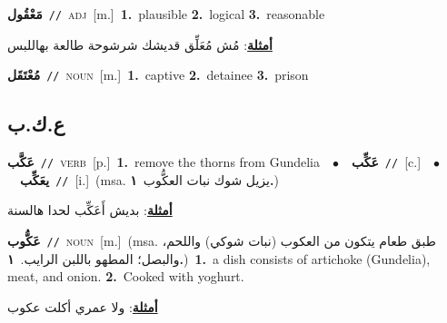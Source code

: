 \documentclass[10pt,a4paper,twoside]{article} %
\begin{document}
\begin{multicols}{2}
{\setlength\topsep{0pt}\textbf{\foreignlanguage{arabic}{مَعْقُول}}\ {\color{gray}\texttt{//}\color{black}}\ \textsc{adj}\ [m.]\ \textbf{1.}~plausible  \textbf{2.}~logical  \textbf{3.}~reasonable\  \begin{flushright}\color{gray}\foreignlanguage{arabic}{\textbf{\underline{\foreignlanguage{arabic}{أمثلة}}}: مُش مُعَلِّق قديشك شرشوحة طالعة بهاللبس}\end{flushright}\color{black}} \vspace{2mm}

{\setlength\topsep{0pt}\textbf{\foreignlanguage{arabic}{مُعْتَقَل}}\ {\color{gray}\texttt{//}\color{black}}\ \textsc{noun}\ [m.]\ \textbf{1.}~captive  \textbf{2.}~detainee  \textbf{3.}~prison\ } \vspace{2mm}

\vspace{-3mm}
\subsection*{\color{blue}\foreignlanguage{arabic}{ع.ك.ب}\color{blue}{}} 

{\setlength\topsep{0pt}\textbf{\foreignlanguage{arabic}{عَكَّب}}\ {\color{gray}\texttt{//}\color{black}}\ \textsc{verb}\ [p.]\ \textbf{1.}~remove the thorns from Gundelia\ \ $\bullet$\ \ \setlength\topsep{0pt}\textbf{\foreignlanguage{arabic}{عَكِّب}}\ {\color{gray}\texttt{//}\color{black}}\ [c.]\ \ $\bullet$\ \ \setlength\topsep{0pt}\textbf{\foreignlanguage{arabic}{يعَكِّب}}\ {\color{gray}\texttt{//}\color{black}}\ [i.]\ \color{gray}(msa. \foreignlanguage{arabic}{يزيل شوك نبات العكُّوب}~\foreignlanguage{arabic}{\textbf{١.}})\color{black}\  \begin{flushright}\color{gray}\foreignlanguage{arabic}{\textbf{\underline{\foreignlanguage{arabic}{أمثلة}}}: بديش أَعَكِّب لحدا هالسنة}\end{flushright}\color{black}} \vspace{2mm}

{\setlength\topsep{0pt}\textbf{\foreignlanguage{arabic}{عَكُّوب}}\ {\color{gray}\texttt{//}\color{black}}\ \textsc{noun}\ [m.]\ \color{gray}(msa. \foreignlanguage{arabic}{طبق طعام يتكون من العكوب (نبات شوكي) واللحم، والبصل؛ المطهو باللبن الرايب.}~\foreignlanguage{arabic}{\textbf{١.}})\color{black}\ \textbf{1.}~a dish consists of artichoke (Gundelia), meat, and onion.  \textbf{2.}~Cooked with yoghurt.\  \begin{flushright}\color{gray}\foreignlanguage{arabic}{\textbf{\underline{\foreignlanguage{arabic}{أمثلة}}}: ولا عمري أكلت عكوب}\end{flushright}\color{black}} \vspace{2mm}


\end{multicols}
\end{document}
